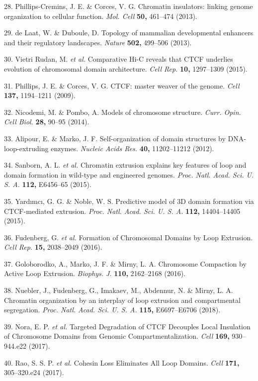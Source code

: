 \documentclass[11pt,twoside]{MPIthesis}
\theoremstyle{definition}
\theoremstyle{definition}
\theoremstyle{definition}
\theoremstyle{remark}
\begin{document}
28. Phillips-Cremins, J. E. \& Corces, V. G. Chromatin insulators:
linking genome organization to cellular function. \emph{Mol. Cell}
\textbf{50,} 461--474 (2013).

29. de Laat, W. \& Duboule, D. Topology of mammalian developmental
enhancers and their regulatory landscapes. \emph{Nature} \textbf{502,}
499--506 (2013).

30. Vietri Rudan, M. \emph{et al.} Comparative Hi-C reveals that CTCF
underlies evolution of chromosomal domain architecture. \emph{Cell Rep.}
\textbf{10,} 1297--1309 (2015).

31. Phillips, J. E. \& Corces, V. G. CTCF: master weaver of the genome.
\emph{Cell} \textbf{137,} 1194--1211 (2009).

32. Nicodemi, M. \& Pombo, A. Models of chromosome structure.
\emph{Curr. Opin. Cell Biol.} \textbf{28,} 90--95 (2014).

33. Alipour, E. \& Marko, J. F. Self-organization of domain structures
by DNA-loop-extruding enzymes. \emph{Nucleic Acids Res.} \textbf{40,}
11202--11212 (2012).

34. Sanborn, A. L. \emph{et al.} Chromatin extrusion explains key
features of loop and domain formation in wild-type and engineered
genomes. \emph{Proc. Natl. Acad. Sci. U. S. A.} \textbf{112,} E6456--65
(2015).

35. Yardımcı, G. G. \& Noble, W. S. Predictive model of 3D domain
formation via CTCF-mediated extrusion. \emph{Proc. Natl. Acad. Sci. U.
S. A.} \textbf{112,} 14404--14405 (2015).

36. Fudenberg, G. \emph{et al.} Formation of Chromosomal Domains by Loop
Extrusion. \emph{Cell Rep.} \textbf{15,} 2038--2049 (2016).

37. Goloborodko, A., Marko, J. F. \& Mirny, L. A. Chromosome Compaction
by Active Loop Extrusion. \emph{Biophys. J.} \textbf{110,} 2162--2168
(2016).

38. Nuebler, J., Fudenberg, G., Imakaev, M., Abdennur, N. \& Mirny, L.
A. Chromatin organization by an interplay of loop extrusion and
compartmental segregation. \emph{Proc. Natl. Acad. Sci. U. S. A.}
\textbf{115,} E6697--E6706 (2018).

39. Nora, E. P. \emph{et al.} Targeted Degradation of CTCF Decouples
Local Insulation of Chromosome Domains from Genomic
Compartmentalization. \emph{Cell} \textbf{169,} 930--944.e22 (2017).

40. Rao, S. S. P. \emph{et al.} Cohesin Loss Eliminates All Loop
Domains. \emph{Cell} \textbf{171,} 305--320.e24 (2017).
\end{document}

